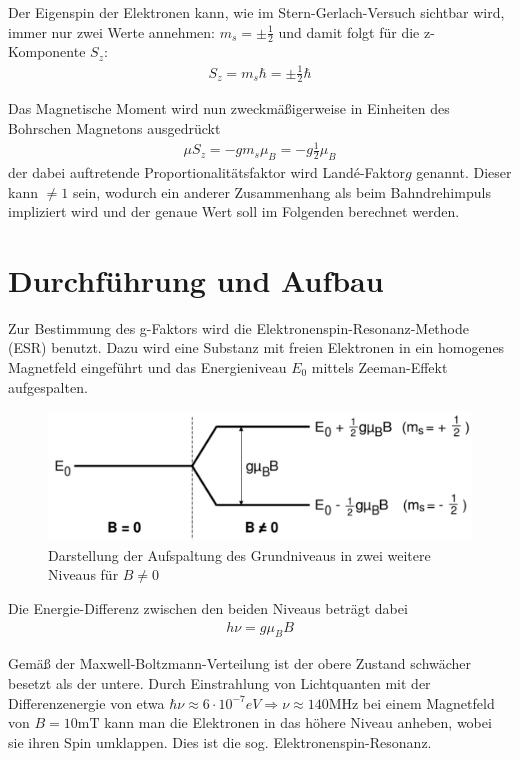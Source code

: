 Der Eigenspin der Elektronen kann, wie im Stern-Gerlach-Versuch sichtbar wird, immer nur zwei Werte annehmen: $m_s=\pm \frac{1}{2}$ und damit folgt für die z-Komponente $S_z$:
\begin{align*}
S_z=m_s\hbar=\pm\frac{1}{2}\hbar
\end{align*}

Das Magnetische Moment wird nun zweckmäßigerweise in Einheiten des Bohrschen Magnetons ausgedrückt
\begin{align*}
\mu S_z=-gm_s\mu_B=-g\frac{1}{2}\mu_B
\end{align*}
der dabei auftretende Proportionalitätsfaktor wird \glqq Landé-Faktor\grqq $g$  genannt. Dieser kann $\neq 1$ sein, wodurch ein anderer Zusammenhang als beim Bahndrehimpuls impliziert wird und der genaue Wert soll im Folgenden berechnet werden.
\section{Durchführung und Aufbau}
Zur Bestimmung des g-Faktors wird die Elektronenspin-Resonanz-Methode (ESR) benutzt. Dazu wird eine Substanz mit freien Elektronen in ein homogenes Magnetfeld eingeführt und das Energieniveau $E_0$ mittels Zeeman-Effekt aufgespalten.\\

\begin{figure}[H]
\includegraphics[scale=0.5]{../pics/aufsp.pdf}
\caption{Darstellung der Aufspaltung des Grundniveaus in zwei weitere Niveaus für $B\neq 0$\protect\footnotemark}
\label{pic_aufspaltung}
\end{figure}

Die Energie-Differenz zwischen den beiden Niveaus beträgt dabei
\begin{align}
h\nu = g \mu_B B
\label{eq_energie}
\end{align}

Gemäß der Maxwell-Boltzmann-Verteilung ist der obere Zustand schwächer besetzt als der untere. Durch Einstrahlung von Lichtquanten mit der Differenzenergie von etwa $\hbar\nu \approx 6\cdot10^{-7}eV \Rightarrow \nu \approx 140 \text{MHz}$ bei einem Magnetfeld von $B=10\text{mT}$ kann man die Elektronen in das höhere Niveau anheben, wobei sie ihren Spin umklappen. Dies ist die sog. \glqq Elektronenspin-Resonanz\grqq.\\

